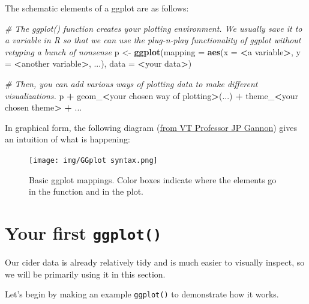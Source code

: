 \documentclass[
]{book}
\newenvironment{Shaded}{\begin{snugshade}}{\end{snugshade}}
\newcommand{\AttributeTok}[1]{\textcolor[rgb]{0.13,0.29,0.53}{#1}}
\newcommand{\CommentTok}[1]{\textcolor[rgb]{0.56,0.35,0.01}{\textit{#1}}}
\newcommand{\FunctionTok}[1]{\textcolor[rgb]{0.13,0.29,0.53}{\textbf{#1}}}
\newcommand{\NormalTok}[1]{#1}
\newcommand{\OtherTok}[1]{\textcolor[rgb]{0.56,0.35,0.01}{#1}}
\newcommand{\SpecialCharTok}[1]{\textcolor[rgb]{0.81,0.36,0.00}{\textbf{#1}}}
\begin{document}
The schematic elements of a ggplot are as follows:

\begin{Shaded}
\begin{Highlighting}[]
\CommentTok{\# The ggplot() function creates your plotting environment.  We usually save it to a variable in R so that we can use the plug{-}n{-}play functionality of ggplot without retyping a bunch of nonsense}
\NormalTok{p }\OtherTok{\textless{}{-}} \FunctionTok{ggplot}\NormalTok{(}\AttributeTok{mapping =} \FunctionTok{aes}\NormalTok{(}\AttributeTok{x =} \SpecialCharTok{\textless{}}\NormalTok{a variable}\SpecialCharTok{\textgreater{}}\NormalTok{, }\AttributeTok{y =} \SpecialCharTok{\textless{}}\NormalTok{another variable}\SpecialCharTok{\textgreater{}}\NormalTok{, ...),}
            \AttributeTok{data =} \SpecialCharTok{\textless{}}\NormalTok{your data}\SpecialCharTok{\textgreater{}}\NormalTok{)}

\CommentTok{\# Then, you can add various ways of plotting data to make different visualizations.}
\NormalTok{p }\SpecialCharTok{+} 
\NormalTok{  geom\_}\SpecialCharTok{\textless{}}\NormalTok{your chosen way of plotting}\SpecialCharTok{\textgreater{}}\NormalTok{(...) }\SpecialCharTok{+}
\NormalTok{  theme\_}\SpecialCharTok{\textless{}}\NormalTok{your chosen theme}\SpecialCharTok{\textgreater{}} \SpecialCharTok{+}
\NormalTok{  ...}
\end{Highlighting}
\end{Shaded}

In graphical form, the following diagram (\href{https://vt-hydroinformatics.github.io/Plotting.html\#our-first-ggplot}{from VT Professor JP Gannon}) gives an intuition of what is happening:

\begin{figure}
\centering
\texttt{[image: img/GGplot syntax.png]}
\caption{Basic ggplot mappings. Color boxes indicate where the elements go in the function and in the plot.}
\end{figure}

\hypertarget{your-first-ggplot}{%
\section{\texorpdfstring{Your first \texttt{ggplot()}}{Your first ggplot()}}\label{your-first-ggplot}}

Our cider data is already relatively tidy and is much easier to visually inspect, so we will be primarily using it in this section.

Let's begin by making an example \texttt{ggplot()} to demonstrate how it works.
\end{document}
